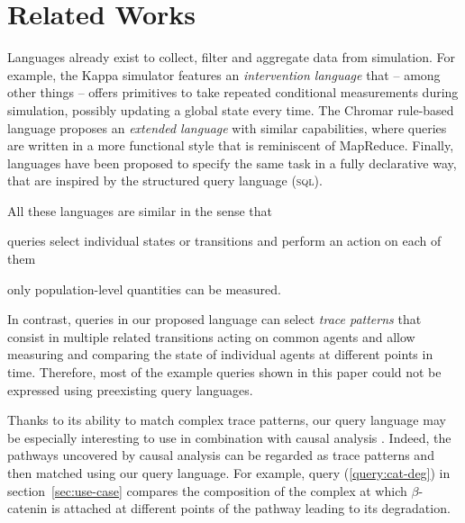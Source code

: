 \section{Related Works}

Languages already exist to collect, filter and aggregate data from
simulation. For example, the Kappa simulator \cite{BoutillierEK17}
features an \emph{intervention language} that -- among other things --
offers primitives to take repeated conditional measurements during
simulation, possibly updating a global state every time. The Chromar
\cite{honorato2017chromar} rule-based language proposes an
\emph{extended language} with similar capabilities, where queries are
written in a more functional style that is reminiscent of
MapReduce. Finally, languages have been proposed
\cite{helms2012toward,zehe2016online} to specify the same task in a
fully declarative way, that are inspired by the {structured query
  language} (\textsc{sql}).

All these languages are similar in the sense that
\begin{inparaenum}[(i)]
\item queries select individual states or transitions and perform
  an action on each of them
\item only population-level quantities can be measured.
\end{inparaenum}
In contrast, queries in our proposed language
can select \emph{trace patterns} that consist in multiple related
transitions acting on common agents and allow measuring and comparing
the state of individual agents at different points in time. Therefore,
most of the example queries shown in this paper could not be expressed
using preexisting query languages.

Thanks to its ability to match complex trace patterns, our query
language may be especially interesting to use in combination with
causal analysis
\cite{DanosEtAl-CONCUR07,DBLP:conf/fsttcs/DanosFFHH12}. Indeed, the
pathways uncovered by causal analysis can be regarded as trace
patterns and then matched using our query language. For example, query
(\ref{query:cat-deg}) in section~\ref{sec:use-case} compares the
composition of the complex at which $\beta$-catenin is attached at
different points of the pathway leading to its degradation.

